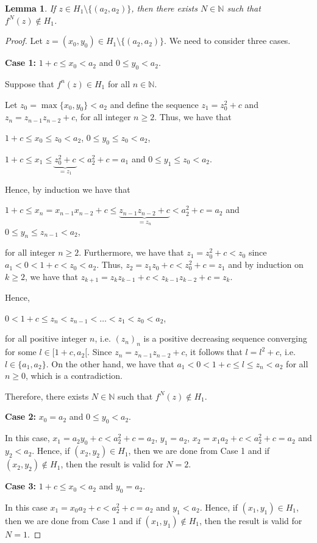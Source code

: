\documentclass[11pt]{amsart}
\newtheorem{lemma}[theorem]{Lemma}
\theoremstyle{definition}
\begin{document}
\begin{lemma}
	If $z\in H_1\setminus \{(a_2,a_2)\}$, then there exists $N\in\mathbb{N}$ such that $f^N(z)\notin H_1$. \label{proph1}
\end{lemma}
\begin{proof} Let $z=(x_0,y_0)\in H_1\setminus \{(a_2,a_2)\}$. We need to consider three cases.
	
	\noindent \textbf{Case 1:} $1+c \leq x_0<a_2$ and  $0 \leq y_0<a_2$.
	
	\noindent Suppose that $f^n(z)\in H_1$ for all $n\in\mathbb{N}$.
	
	Let $z_0=\max\{x_0,y_0\}<a_2$ and define the sequence $z_1=z_0^2+c$ and $z_n=z_{n-1}z_{n-2}+c$, for all integer $n\geq 2$. Thus, we have that
\begin{center}
		$1+c\leq x_0\leq z_0<a_2$, $0\leq y_0\leq z_0<a_2$,
		
		$1+c\leq x_1\leq \underbrace{z_0^2+c}_{=z_1}<a_2^2+c=a_1$ and $0\leq y_1\leq z_0<a_2$.
\end{center}
Hence, by induction we have that
\begin{center}	
		$1+c\leq x_n=x_{n-1}x_{n-2}+c\leq \underbrace{z_{n-1}z_{n-2}+c}_{=z_n}  <a_2^2+c=a_2 $ \newline and $0\leq y_n\leq z_{n-1}<a_2$,
	\end{center}
	
	\noindent for all integer $n\geq 2$. Furthermore, we have that $z_1=z_0^2+c<z_0$ since $a_1<0<1+c<z_0<a_2$. Thus, $z_2=z_1z_0+c<z_0^2+c=z_1$ and by induction on $k\geq 2$, we have that $z_{k+1}=z_kz_{k-1}+c<z_{k-1}z_{k-2}+c=z_k$.

Hence,
\begin{center}
$0<1+c\leq z_n<z_{n-1}<\ldots <z_1<z_0<a_2$,
\end{center}
 for all positive integer $n$, i.e. $(z_n)_n$ is a positive decreasing sequence converging for some $l\in[1+c,a_2[$. Since $z_n=z_{n-1}z_{n-2}+c$, it follows that $l=l^2+c$, i.e. $l\in\{a_1,a_2\}$. On the other hand, we have that $a_1<0<1+c\leq l\leq z_n<a_2$ for all $n\geq 0$, which is a contradiction.
	
	Therefore, there exists $N\in\mathbb{N}$ such that $f^N(z)\notin H_1$.
	
	\noindent \textbf{Case 2:} $x_0=a_2$ and $0\leq y_0<a_2$.
	
	In this case, $x_1=a_2y_0+c<a_2^2+c=a_2$, $y_1=a_2$, $x_2=x_1a_2+c<a_2^2+c=a_2$ and $y_2<a_2$. Hence, if $(x_2,y_2)\in H_1$, then we are done from Case 1 and if $(x_2,y_2)\notin H_1$, then the result is valid for $N=2$.
	
	\noindent \textbf{Case 3:} $1+c\leq x_0<a_2$ and $y_0=a_2$.
	
	In this case $x_1=x_0a_2+c<a_2^2+c=a_2$ and $y_1<a_2$. Hence, if $(x_1,y_1)\in H_1$, then we are done from Case 1 and if $(x_1,y_1)\notin H_1$,  then the result is valid for $N=1$.
\end{proof}
\end{document}

